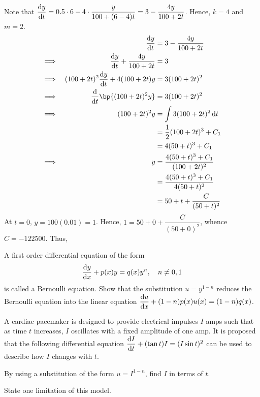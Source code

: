 \documentclass{echw}
\begin{document}
    \solution
        Note that $\dfrac{\mathrm{d} y}{\mathrm{d} t} = 0.5 \cdot 6 - 4 \cdot \dfrac{y}{100 + (6-4)t} = 3 - \dfrac{4y}{100 + 2t}$. Hence, $k = 4$ and $m = 2$.
        \begin{alignat*}{2}
            && \der{y}{t} &= 3 - \dfrac{4y}{100 + 2t}\\
            \implies&& \der{y}{t} + \dfrac{4y}{100 + 2t} &= 3\\
            \implies&& (100+2t)^2 \der{y}{t} + 4(100+2t)y &= 3(100+2t)^2\\
            \implies&& \der{}{t} \bp{(100+2t)^2 y} &= 3(100 + 2t)^2\\
            \implies&& (100+2t)^2 y &= \int 3 (100+2t)^2 \d t\\
            && &= \dfrac12 (100 + 2t)^3 + C_1\\
            && &= 4(50 + t)^3 + C_1\\
            \implies&& y &= \dfrac{4(50+t)^3 + C_1}{(100+2t)^2}\\
            && &= \dfrac{4(50+t)^3 + C_1}{4(50 + t)^2}\\
            && &= 50 + t + \dfrac{C}{(50 + t)^2}
        \end{alignat*}
        At $t = 0$, $y = 100(0.01) = 1$. Hence, $1 = 50 + 0 + \dfrac{C}{(50+0)^2}$, whence $C = -122500$. Thus,

    \problem{}
        A first order differential equation of the form \[\dfrac{\mathrm{d} y}{\mathrm{d} x} + p(x) y = q(x) y^n, \quad n \neq 0, 1\] is called a Bernoulli equation. Show that the substitution $u = y^{1-n}$ reduces the Bernoulli equation into the linear equation $\dfrac{\mathrm{d} u}{\mathrm{d} x} + (1-n)p(x)u(x) = (1-n)q(x)$.

        A cardiac pacemaker is designed to provide electrical impulses $I$ amps such that as time $t$ increases, $I$ oscillates with a fixed amplitude of one amp. It is proposed that the following differential equation $\dfrac{\mathrm{d} I}{\mathrm{d} t} + (\tan t) I = (I \sin t)^2$ can be used to describe how $I$ changes with $t$.

        By using a substitution of the form $u = I^{1-n}$, find $I$ in terms of $t$.

        State one limitation of this model.
\end{document}
